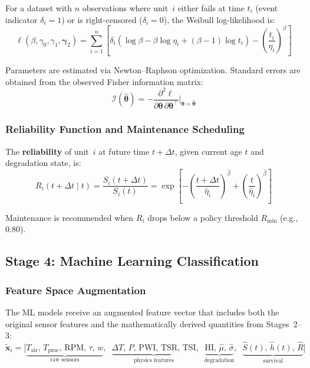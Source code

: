 \documentclass[12pt, a4paper]{article}
\newcommand{\HI}{\mathrm{HI}}
\begin{document}
For a dataset with $n$ observations where unit~$i$ either fails at time $t_i$ (event indicator $\delta_i = 1$) or is right-censored ($\delta_i = 0$), the Weibull log-likelihood is:
\begin{equation}\label{eq:weibull-ll}
    \ell(\beta, \gamma_0, \gamma_1, \boldsymbol{\gamma}_2) = \sum_{i=1}^{n}\left[\delta_i\!\left(\log\beta - \beta\log\eta_i + (\beta-1)\log t_i\right) - \left(\frac{t_i}{\eta_i}\right)^{\!\beta}\right]
\end{equation}

Parameters are estimated via Newton--Raphson optimization. Standard errors are obtained from the observed Fisher information matrix:
\begin{equation}\label{eq:fisher}
    \mathcal{I}(\hat{\boldsymbol{\theta}}) = -\frac{\partial^2 \ell}{\partial\boldsymbol{\theta}\,\partial\boldsymbol{\theta}^\top}\bigg|_{\boldsymbol{\theta}=\hat{\boldsymbol{\theta}}}
\end{equation}

\subsubsection{Reliability Function and Maintenance Scheduling}

The \textbf{reliability} of unit~$i$ at future time $t + \Delta t$, given current age $t$ and degradation state, is:
\begin{equation}\label{eq:reliability}
    R_i(t + \Delta t \mid t) = \frac{S_i(t + \Delta t)}{S_i(t)} = \exp\!\left[-\left(\frac{t + \Delta t}{\hat{\eta}_i}\right)^{\!\hat{\beta}} + \left(\frac{t}{\hat{\eta}_i}\right)^{\!\hat{\beta}}\right]
\end{equation}

Maintenance is recommended when $R_i$ drops below a policy threshold $R_{\min}$ (e.g., 0.80).

\subsection{Stage 4: Machine Learning Classification}

\subsubsection{Feature Space Augmentation}

The ML models receive an augmented feature vector that includes both the original sensor features and the mathematically derived quantities from Stages~2--3:
\begin{equation}\label{eq:augmented}
    \tilde{\mathbf{x}}_i = \bigl[\underbrace{T_{\mathrm{air}},\, T_{\mathrm{proc}},\, \mathrm{RPM},\, \tau,\, w}_{\text{raw sensors}},\;\; \underbrace{\Delta T,\, P,\, \mathrm{PWI},\, \mathrm{TSR},\, \mathrm{TSI}}_{\text{physics features}},\;\; \underbrace{\HI,\, \hat{\mu},\, \hat{\sigma}}_{\text{degradation}},\;\; \underbrace{\hat{S}(t),\, \hat{h}(t),\, \hat{R}}_{\text{survival}}\bigr]
\end{equation}
\end{document}
